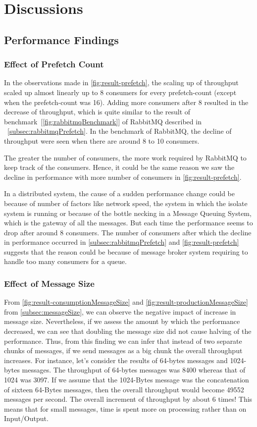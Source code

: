 \chapter{Discussions}\label{chapter:discussions}

\section{Performance Findings}
\subsection{Effect of Prefetch Count}
\label{subsec:discussion-prefetch}
  In the observations made in \autoref{fig:result-prefetch}, the scaling up of throughput scaled up almost linearly up to 8 consumers for every prefetch-count (except when the prefetch-count was 16). Adding more consumers after 8 resulted in the decrease of throughput, which is quite similar to the result of benchmark~[\autoref{fig:rabbitmqBenchmark}] of RabbitMQ described in ~\autoref{subsec:rabbitmqPrefetch}. In the benchmark of RabbitMQ, the decline of throughput were seen when there are around 8 to 10 consumers.

  The greater the number of consumers, the more work required by RabbitMQ to keep track of the consumers. Hence, it could be the same reason we saw the decline in performance with more number of consumers in \autoref{fig:result-prefetch}.

  In a distributed system, the cause of a sudden performance change could be because of number of factors like network speed, the system in which the isolate system is running or because of the bottle necking in a Message Queuing System, which is the gateway of all the messages. But each time the performance seems to drop after around 8 consumers. The number of consumers after which the decline in performance occurred in \autoref{subsec:rabbitmqPrefetch} and \autoref{fig:result-prefetch} suggests that the reason could be because of message broker system requiring to handle too many consumers for a queue.

\subsection{Effect of Message Size}
  From \autoref{fig:result-consumptionMessageSize} and \autoref{fig:result-productionMessageSize} from \autoref{subsec:messageSize}, we can observe the negative impact of increase in message size. Nevertheless, if we assess the amount by which the performance decreased, we can see that doubling the message size did not cause halving of the performance. Thus, from this finding we can infer that instead of two separate chunks of messages, if we send messages as a big chunk the overall throughput increases. For instance, let's consider the results of 64-bytes messages and 1024-bytes messages. The throughput of 64-bytes messages was 8400 whereas that of 1024 was 3097. If we assume that the 1024-Bytes message was the concatenation of sixteen 64-Bytes messages, then the overall throughput would become 49552 messages per second. The overall increment of throughput by about 6 times! This means that for small messages, time is spent more on processing rather than on Input/Output.


